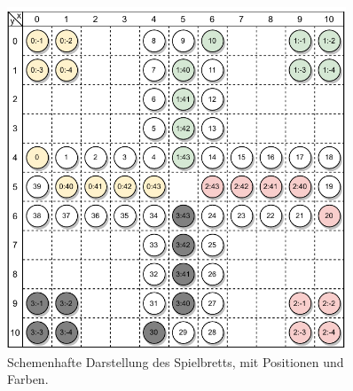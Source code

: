 \begin{figure}[h]
\centering
\includegraphics[width=0.90\textwidth]{bilder/PDF_SVG/MAEDN_BOARD_DIAGRAM.pdf}
\caption{Schemenhafte Darstellung des Spielbretts, mit Positionen und Farben.}
\label{fig:maednbrett}
\end{figure}
